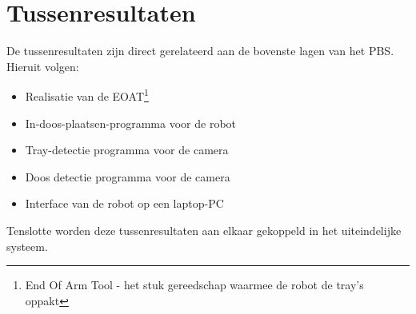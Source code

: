 
\section{Tussenresultaten}
De tussenresultaten zijn direct gerelateerd aan de bovenste lagen van het PBS.  
\newline
\newline
Hieruit volgen:
\begin{itemize}
    \item Realisatie van de EOAT\footnote{End Of Arm Tool - het stuk gereedschap waarmee de robot de tray's oppakt}
    \item In-doos-plaatsen-programma voor de robot
    \item Tray-detectie programma voor de camera
    \item Doos detectie programma voor de camera
    \item Interface van de robot op een laptop-PC
\end{itemize}
Tenslotte worden deze tussenresultaten aan elkaar gekoppeld in het uiteindelijke systeem.



